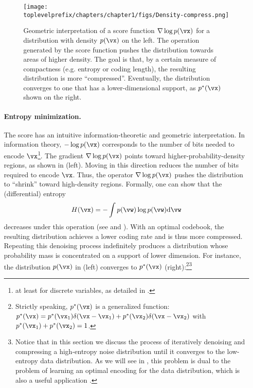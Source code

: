 \documentclass[../../book-main.tex]{subfiles}
\begin{document}
\begin{figure}
    \centering
    \texttt{[image: \\toplevelprefix/chapters/chapter1/figs/Density-compress.png]}
    \caption{Geometric interpretation of a score function \(\nabla \log p(\vx)\) for a distribution with density \(p(\vx)\) on the left. The operation generated by the score function pushes the distribution towards areas of higher density. The goal is that, by a certain measure of compactness (e.g. entropy or coding length), the resulting distribution is more ``compressed''. Eventually, the distribution converges to one that has a lower-dimensional support, as \(p^{*}(\vx)\) shown on the right.}
    \label{fig:score-function}
\end{figure}

\paragraph{Entropy minimization.} The score has an intuitive information-theoretic and geometric interpretation. In information theory, \(-\log p(\vx)\) corresponds to the number of bits needed to encode \(\vx\)\footnote{at least for discrete variables, as detailed in .}. The gradient \(\nabla \log p(\vx)\) points toward higher-probability-density regions, as shown in  (left). Moving in this direction reduces the number of bits required to encode \(\vx\). Thus, the operator \(\nabla \log p(\vx)\) pushes the distribution to ``shrink'' toward high-density regions. Formally, one can show that the (differential) entropy
\begin{equation}
    H(\vx) = - \int p(\vw) \log p(\vw) \odif{\vw}
\end{equation}
decreases under this operation (see  and ). With an optimal codebook, the resulting distribution achieves a lower coding rate and is thus more compressed. Repeating this denoising process indefinitely produces a distribution whose probability mass is concentrated on a support of lower dimension. For instance, the distribution \(p(\vx)\) in  (left) converges to \(p^{*}(\vx)\) (right):\footnote{Strictly speaking, \(p^{*}(\vx)\) is a generalized function: \(p^{*}(\vx) = p^{*}(\vx_{1})\delta(\vx-\vx_{1}) + p^{*}(\vx_{2}) \delta(\vx-\vx_{2})\) with \(p^{*}(\vx_{1}) + p^{*}(\vx_{2}) = 1\).}\footnote{Notice that in this section we discuss the process of iteratively denoising and compressing a high-entropy noise distribution until it converges to the low-entropy data distribution. As we will see in , this problem is dual to the problem of learning an optimal encoding for the data distribution, which is also a useful application \cite{relic2024lossy}.}
\end{document}
